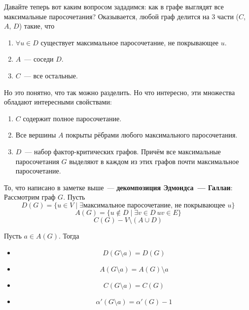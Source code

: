 \documentclass{article}
\begin{document}
    \begin{remark}
        Давайте теперь вот каким вопросом зададимся: как в графе выглядят все максимальные паросочетания? Оказывается, любой граф делится на 3 части ($C$, $A$, $D$) такие, что
        \begin{enumerate}
            \item $\forall u\in D$ существует максимальное паросочетание, не покрывающее $u$.
            \item $A$~--- соседи $D$.
            \item $C$~--- все остальные.
        \end{enumerate}
        Но это понятно, что так можно разделить. Но что интересно, эти множества обладают интересными свойствами:
        \begin{enumerate}
            \item $C$ содержит полное паросочетание.
            \item Все вершины $A$ покрыты рёбрами любого максимального паросочетания.
            \item $D$~--- набор фактор-критических графов. Причём все максимальные паросочетания $G$ выделяют в каждом из этих графов почти максимальное паросочетание.
        \end{enumerate}
    \end{remark}
    \begin{definition}
        То, что написано в заметке выше~--- \textbf{декомпозиция Эдмондса~--- Галлаи}:\\
        Рассмотрим граф $G$. Пусть
        $$D(G)=\{u\in V\mid \exists\text{максимальное паросочетание, не покрывающее }u\}$$
        $$
        A(G)=\{u\notin D\mid \exists v\in D~uv\in E\}
        $$ 
        $$
        C(G)-V\setminus(A\cup D)
        $$
    \end{definition}
    \begin{lemma}
        Пусть $a\in A(G)$. Тогда
        \begin{multicols}{2}
            \begin{itemize}
                \item $$D(G\setminus a)=D(G)$$
                \item $$A(G\setminus a)=A(G)\setminus a$$
                \item $$C(G\setminus a)=C(G)$$
                \item $$\alpha'(G\setminus a)=\alpha'(G)-1$$
            \end{itemize}
        \end{multicols}
    \end{lemma}
\end{document}
